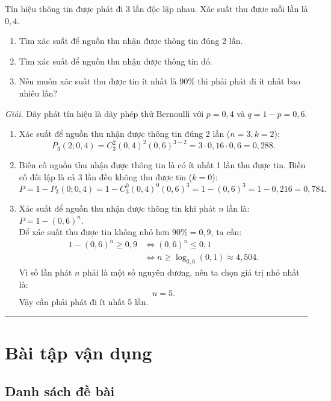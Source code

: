 \begin{vidu}
Tín hiệu thông tin được phát đi 3 lần độc lập nhau. Xác suất thu được mỗi lần là $0{,}4$.
\begin{enumerate}[label=\alph*)]
    \item Tìm xác suất để nguồn thu nhận được thông tin đúng 2 lần.
    \item Tìm xác suất để nguồn thu nhận được thông tin đó.
    \item Nếu muốn xác suất thu được tin ít nhất là 90\% thì phải phát đi ít nhất bao nhiêu lần?
\end{enumerate}
\textit{Giải.} Dãy phát tín hiệu là dãy phép thử Bernoulli với $p = 0{,}4$ và $q = 1 - p = 0{,}6$.
\begin{enumerate}[label=\alph*)]
    \item Xác suất để nguồn thu nhận được thông tin đúng 2 lần ($n = 3, k = 2$):
    \[
    P_3(2; 0{,}4) = C_3^2 (0{,}4)^2 (0{,}6)^{3 - 2} = 3 \cdot 0{,}16 \cdot 0{,}6 = 0{,}288.
    \]
    \item Biến cố nguồn thu nhận được thông tin là có ít nhất 1 lần thu được tin. Biến cố đối lập là cả 3 lần đều không thu được tin ($k = 0$):
    \[
    P = 1 - P_3(0; 0{,}4) = 1 - C_3^0 (0{,}4)^0 (0{,}6)^3 = 1 - (0{,}6)^3 = 1 - 0{,}216 = 0{,}784.
    \]
    \item Xác suất để nguồn thu nhận được thông tin khi phát $n$ lần là: $P = 1 - (0{,}6)^n$.\\
    Để xác suất thu được tin không nhỏ hơn $90\% = 0{,}9$, ta cần:
    \begin{align*}
    1 - (0{,}6)^n \ge 0{,}9 &\iff (0{,}6)^n \le 0{,}1 \\
                           &\iff n \ge \log_{0{,}6}(0{,}1) \approx 4{,}504.
    \end{align*}
    Vì số lần phát $n$ phải là một số nguyên dương, nên ta chọn giá trị nhỏ nhất là:
    \[
    n = 5.
    \]
    Vậy cần phải phát đi ít nhất 5 lần.
\end{enumerate}
\end{vidu}

\vspace{1em}
\hrule
\vspace{1.5em}

\section{Bài tập vận dụng}

\subsection{Danh sách đề bài}

